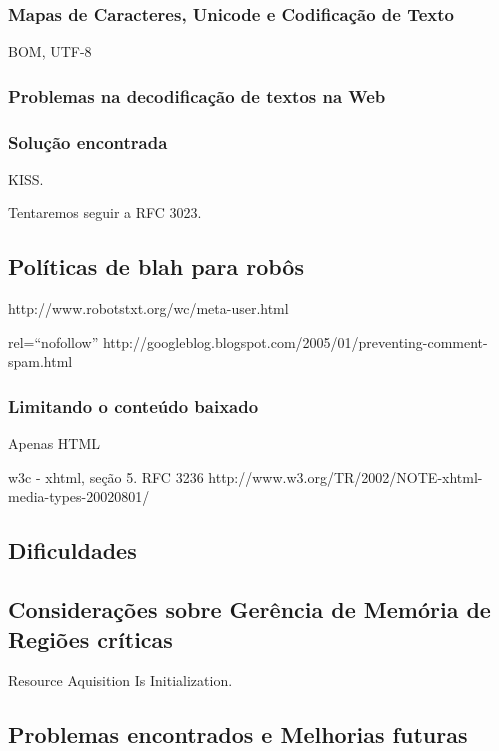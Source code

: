 \documentclass[10pt,twocolumn]{article}
\begin{document}
\subsubsection{Mapas de Caracteres, Unicode e Codificação de Texto}
BOM, UTF-8

\subsubsection{Problemas na decodificação de textos na Web}

\subsubsection{Solução encontrada}

KISS.

Tentaremos seguir a RFC 3023.
\subsection{Políticas de blah para robôs}
http://www.robotstxt.org/wc/meta-user.html

rel=``nofollow'' http://googleblog.blogspot.com/2005/01/preventing-comment-spam.html  



\subsubsection{Limitando o conteúdo baixado}

Apenas HTML 

w3c - xhtml, seção 5.
RFC 3236
http://www.w3.org/TR/2002/NOTE-xhtml-media-types-20020801/

\subsection{Dificuldades}

\subsection{Considerações sobre Gerência de Memória de Regiões críticas}

Resource Aquisition Is Initialization.

\subsection{Problemas encontrados e Melhorias futuras}
\end{document}
